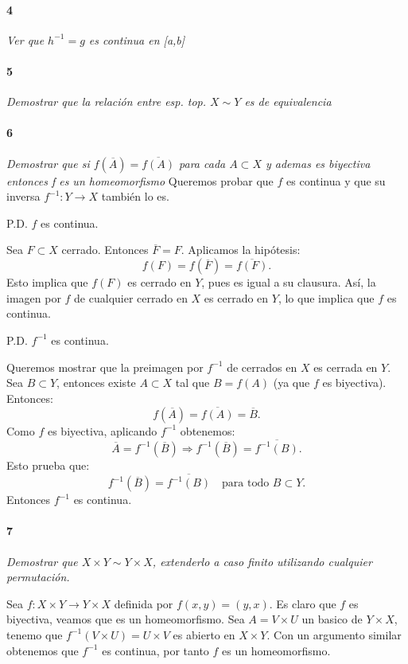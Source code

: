 \documentclass[12pt]{article}
\begin{document}
\paragraph{4}
\textit{Ver que $h^{-1}=g$ es continua en [a,b]}

\paragraph{5}
\textit{Demostrar que la relación entre esp. top. $X\sim Y$ es de equivalencia}

\paragraph{6}
\textit{Demostrar que si $f(\overline{A})=\overline{f(A)}$ para cada $A\subset X$ y ademas es biyectiva entonces f es un homeomorfismo}
Queremos probar que \( f \) es continua y que su inversa \( f^{-1} : Y \to X \) también lo es.

P.D. \( f \) es continua.

Sea \( F \subset X \) cerrado. Entonces \( \overline{F} = F \). Aplicamos la hipótesis:
\[
f(F) = f(\overline{F}) = \overline{f(F)}.
\]
Esto implica que \( f(F) \) es cerrado en \( Y \), pues es igual a su clausura.  
Así, la imagen por \( f \) de cualquier cerrado en \( X \) es cerrado en \( Y \),  
lo que implica que \( f \) es continua.

P.D. \( f^{-1} \) es continua.

Queremos mostrar que la preimagen por \( f^{-1} \) de cerrados en \( X \) es cerrada en \( Y \).  
Sea \( B \subset Y \), entonces existe \( A \subset X \) tal que \( B = f(A) \) (ya que \( f \) es biyectiva).  
Entonces:
\[
f(\overline{A}) = \overline{f(A)} = \overline{B}.
\]
Como \( f \) es biyectiva, aplicando \( f^{-1} \) obtenemos:
\[
\overline{A} = f^{-1}(\overline{B}) \Rightarrow f^{-1}(\overline{B}) = \overline{f^{-1}(B)}.
\]
Esto prueba que:
\[
f^{-1}(\overline{B}) = \overline{f^{-1}(B)} \quad \text{para todo } B \subset Y.
\]
Entonces \( f^{-1} \) es continua.

\paragraph{7}
\textit{Demostrar que $X\times Y \sim Y \times X$, extenderlo a caso finito utilizando cualquier permutación.}

Sea $f: X \times Y \to Y \times X$ definida por $f(x,y)=(y,x)$. Es claro que $f$ es biyectiva, veamos que es un homeomorfismo. Sea $A=V \times U$ un basico de $Y \times X$, 
tenemo que $f^{-1}(V \times U)=U \times V$ es abierto en $X \times Y$. Con un argumento similar obtenemos que $f^{-1}$ es continua, por tanto $f$ es un homeomorfismo.
\end{document}
